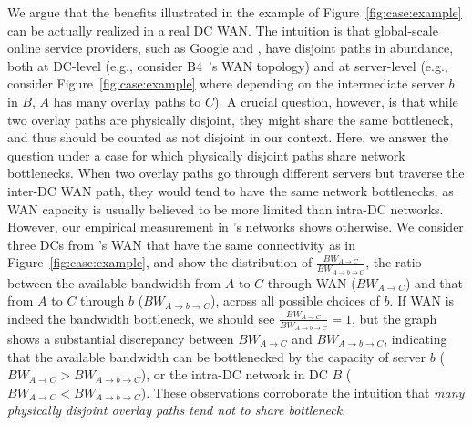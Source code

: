 We argue that the benefits illustrated in the example of
Figure~\ref{fig:case:example} can be actually realized in a
real DC WAN. The intuition is that
global-scale online service providers,
such as Google and \company, have disjoint paths in abundance,
both at DC-level (e.g., consider B4~\cite{b4}'s WAN topology)
and at server-level (e.g., consider Figure~\ref{fig:case:example}
where depending on the intermediate server $b$ in $B$,
$A$ has many overlay paths to $C$).
A crucial question, however, is that while two overlay paths are
physically disjoint, they might share the same bottleneck, and
thus should be counted as not disjoint in our context.
Here, we answer the question under a case for which physically
disjoint paths share network bottlenecks.
When two overlay paths go through different servers but traverse
the inter-DC WAN path, they would tend to have the same network
bottlenecks, as WAN capacity is usually believed to be more
limited than intra-DC networks.
However, our empirical measurement in \company's networks shows
otherwise.
We consider three DCs from \company's WAN that have the same
connectivity as in Figure~\ref{fig:case:example},
and show the distribution of
$\frac{BW_{A\rightarrow C}}{BW_{A\rightarrow b\rightarrow C}}$,
the ratio between the available bandwidth
from $A$ to $C$ through WAN ($BW_{A\rightarrow C}$) and
that from $A$ to $C$ through $b$
($BW_{A\rightarrow b\rightarrow C}$),
across all possible choices of $b$.
If WAN is indeed the bandwidth bottleneck, we should see
$\frac{BW_{A\rightarrow C}}{BW_{A\rightarrow b\rightarrow C}}=1$,
but the graph shows a substantial discrepancy between
$BW_{A\rightarrow C}$ and $BW_{A\rightarrow b\rightarrow C}$,
indicating that the available bandwidth can be bottlenecked by
the capacity of server $b$
($BW_{A\rightarrow C}>BW_{A\rightarrow b\rightarrow C}$),
or the intra-DC network in DC $B$
($BW_{A\rightarrow C}<BW_{A\rightarrow b\rightarrow C}$).
These observations corroborate the intuition that
{\em many physically
disjoint overlay paths tend not to share bottleneck}.



